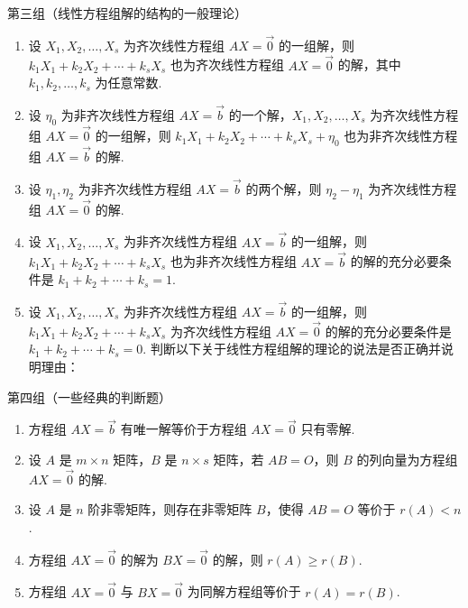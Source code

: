 \begin{enumerate}
          第三组（线性方程组解的结构的一般理论）
          \begin{enumerate}[resume*]
              \item 设 $X_1,X_2,\ldots,X_s$ 为齐次线性方程组 $AX=\vec{0}$ 的一组解，则 $k_1X_1+k_2X_2+\cdots+k_sX_s$ 也为齐次线性方程组 $AX=\vec{0}$ 的解，其中 $k_1,k_2,\ldots,k_s$ 为任意常数.

              \item 设 $\eta_0$ 为非齐次线性方程组 $AX=\vec{b}$ 的一个解，$X_1,X_2,\ldots,X_s$ 为齐次线性方程组 $AX=\vec{0}$ 的一组解，则 $k_1X_1+k_2X_2+\cdots+k_sX_s+\eta_0$ 也为非齐次线性方程组 $AX=\vec{b}$ 的解.

              \item 设 $\eta_1,\eta_2$ 为非齐次线性方程组 $AX=\vec{b}$ 的两个解，则 $\eta_2-\eta_1$ 为齐次线性方程组 $AX=\vec{0}$ 的解.

              \item 设 $X_1,X_2,\ldots,X_s$ 为非齐次线性方程组 $AX=\vec{b}$ 的一组解，则 $k_1X_1+k_2X_2+\cdots+k_sX_s$ 也为非齐次线性方程组 $AX=\vec{b}$ 的解的充分必要条件是 $k_1+k_2+\cdots+k_s=1$.

              \item 设 $X_1,X_2,\ldots,X_s$ 为非齐次线性方程组 $AX=\vec{b}$ 的一组解，则 $k_1X_1+k_2X_2+\cdots+k_sX_s$ 为齐次线性方程组 $AX=\vec{0}$ 的解的充分必要条件是 $k_1+k_2+\cdots+k_s=0$. 判断以下关于线性方程组解的理论的说法是否正确并说明理由：
          \end{enumerate}

          第四组（一些经典的判断题）
          \begin{enumerate}[resume*]
              \item 方程组 $AX=\vec{b}$ 有唯一解等价于方程组 $AX=\vec{0}$ 只有零解.

              \item 设 $A$ 是 $m \times n$ 矩阵，$B$ 是 $n \times s$ 矩阵，若 $AB=O$，则 $B$ 的列向量为方程组 $AX=\vec{0}$ 的解.

              \item 设 $A$ 是 $n$ 阶非零矩阵，则存在非零矩阵 $B$，使得 $AB=O$ 等价于 $r(A)<n$.

              \item 方程组 $AX=\vec{0}$ 的解为 $BX=\vec{0}$ 的解，则 $r(A) \geqslant r(B)$.

              \item 方程组 $AX=\vec{0}$ 与 $BX=\vec{0}$ 为同解方程组等价于 $r(A)=r(B)$.
          \end{enumerate}


\end{enumerate}
